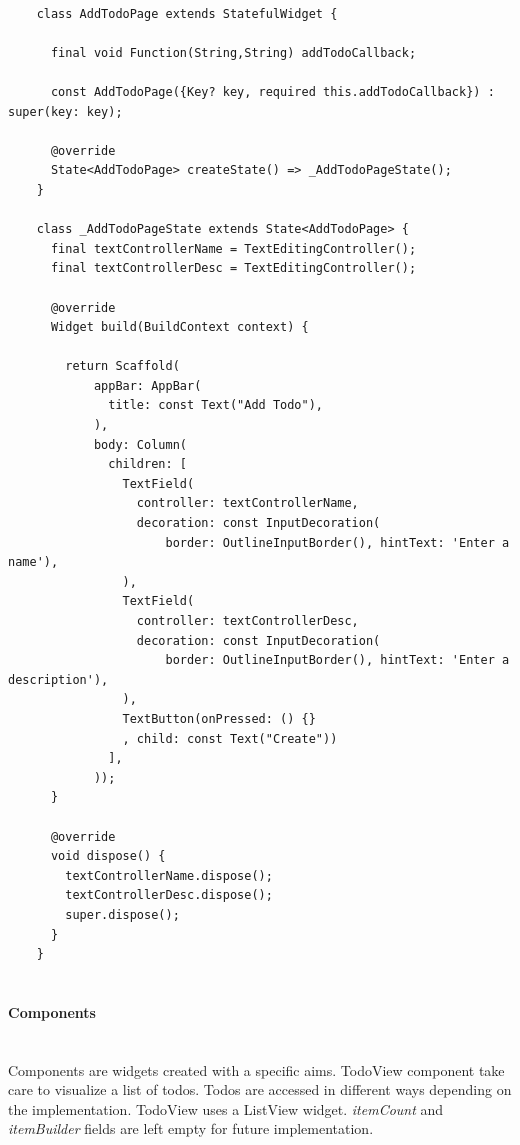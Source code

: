 	 \mbox{}
	\begin{verbatim}
	
	class AddTodoPage extends StatefulWidget {
	
	  final void Function(String,String) addTodoCallback;
	
	  const AddTodoPage({Key? key, required this.addTodoCallback}) : super(key: key);
	
	  @override
	  State<AddTodoPage> createState() => _AddTodoPageState();
	}
	
	class _AddTodoPageState extends State<AddTodoPage> {
	  final textControllerName = TextEditingController();
	  final textControllerDesc = TextEditingController();
	
	  @override
	  Widget build(BuildContext context) {
	
	    return Scaffold(
	        appBar: AppBar(
	          title: const Text("Add Todo"),
	        ),
	        body: Column(
	          children: [
	            TextField(
	              controller: textControllerName,
	              decoration: const InputDecoration(
	                  border: OutlineInputBorder(), hintText: 'Enter a name'),
	            ),
	            TextField(
	              controller: textControllerDesc,
	              decoration: const InputDecoration(
	                  border: OutlineInputBorder(), hintText: 'Enter a description'),
	            ),
	            TextButton(onPressed: () {}
	            , child: const Text("Create"))
	          ],
	        ));
	  }
	
	  @override
	  void dispose() {
	    textControllerName.dispose();
	    textControllerDesc.dispose();
	    super.dispose();
	  }
	}
	
	\end{verbatim}
	
	\mbox{}
	
	
	\paragraph{Components} \mbox{} \\
	\label{par:todo_app_components}
	Components are widgets created with a specific aims.
	TodoView component take care to visualize a list of todos. Todos are accessed in different ways depending on the implementation. TodoView uses a ListView widget. \textit{itemCount} and \textit{itemBuilder} fields are left empty for future implementation.
	
	\mbox{}\\
	

